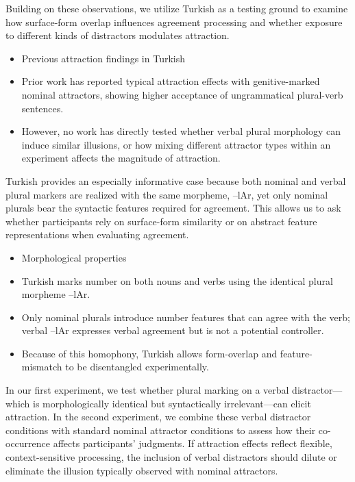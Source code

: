 \documentclass[
  authoryear,
  preprint]{elsarticle}
\providecommand{\tightlist}{%
  \setlength{\itemsep}{0pt}\setlength{\parskip}{0pt}}
\begin{document}
Building on these observations, we utilize Turkish as a testing ground
to examine how surface-form overlap influences agreement processing and
whether exposure to different kinds of distractors modulates attraction.

\begin{itemize}
\tightlist
\item
  Previous attraction findings in Turkish
\item
  Prior work has reported typical attraction effects with
  genitive-marked nominal attractors, showing higher acceptance of
  ungrammatical plural-verb sentences.
\item
  However, no work has directly tested whether verbal plural morphology
  can induce similar illusions, or how mixing different attractor types
  within an experiment affects the magnitude of attraction.
\end{itemize}

Turkish provides an especially informative case because both nominal and
verbal plural markers are realized with the same morpheme, --lAr, yet
only nominal plurals bear the syntactic features required for agreement.
This allows us to ask whether participants rely on surface-form
similarity or on abstract feature representations when evaluating
agreement.

\begin{itemize}
\tightlist
\item
  Morphological properties
\item
  Turkish marks number on both nouns and verbs using the identical
  plural morpheme --lAr.
\item
  Only nominal plurals introduce number features that can agree with the
  verb; verbal --lAr expresses verbal agreement but is not a potential
  controller.
\item
  Because of this homophony, Turkish allows form-overlap and
  feature-mismatch to be disentangled experimentally.
\end{itemize}

In our first experiment, we test whether plural marking on a verbal
distractor---which is morphologically identical but syntactically
irrelevant---can elicit attraction. In the second experiment, we combine
these verbal distractor conditions with standard nominal attractor
conditions to assess how their co-occurrence affects participants'
judgments. If attraction effects reflect flexible, context-sensitive
processing, the inclusion of verbal distractors should dilute or
eliminate the illusion typically observed with nominal attractors.
\end{document}
